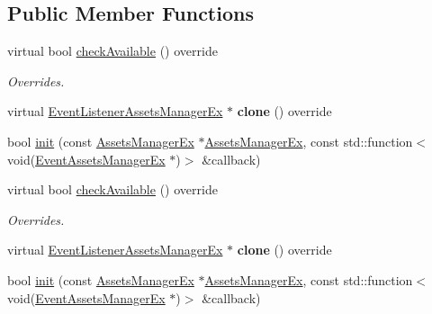 \subsection*{Public Member Functions}
\begin{DoxyCompactItemize}
\item 
\mbox{\label{classEventListenerAssetsManagerEx_aa9c6ee60c7390e0dea4c39a1036a25e4}} 
virtual bool \hyperlink{classEventListenerAssetsManagerEx_aa9c6ee60c7390e0dea4c39a1036a25e4}{check\+Available} () override
\begin{DoxyCompactList}\small\item\em Overrides. \end{DoxyCompactList}\item 
\mbox{\label{classEventListenerAssetsManagerEx_a6981b7ce473804c5f5978c598207ebd3}} 
virtual \hyperlink{classEventListenerAssetsManagerEx}{Event\+Listener\+Assets\+Manager\+Ex} $\ast$ {\bfseries clone} () override
\item 
bool \hyperlink{classEventListenerAssetsManagerEx_a23a2632c5bab9e93ea6f1ef01b22a1c7}{init} (const \hyperlink{classAssetsManagerEx}{Assets\+Manager\+Ex} $\ast$\hyperlink{classAssetsManagerEx}{Assets\+Manager\+Ex}, const std\+::function$<$ void(\hyperlink{classEventAssetsManagerEx}{Event\+Assets\+Manager\+Ex} $\ast$)$>$ \&callback)
\item 
\mbox{\label{classEventListenerAssetsManagerEx_a8c04d1cd20093a2dc88d4b2ab56ec5c8}} 
virtual bool \hyperlink{classEventListenerAssetsManagerEx_a8c04d1cd20093a2dc88d4b2ab56ec5c8}{check\+Available} () override
\begin{DoxyCompactList}\small\item\em Overrides. \end{DoxyCompactList}\item 
\mbox{\label{classEventListenerAssetsManagerEx_a8b80c221e7255460eee92dda6f21cfb0}} 
virtual \hyperlink{classEventListenerAssetsManagerEx}{Event\+Listener\+Assets\+Manager\+Ex} $\ast$ {\bfseries clone} () override
\item 
bool \hyperlink{classEventListenerAssetsManagerEx_a23a2632c5bab9e93ea6f1ef01b22a1c7}{init} (const \hyperlink{classAssetsManagerEx}{Assets\+Manager\+Ex} $\ast$\hyperlink{classAssetsManagerEx}{Assets\+Manager\+Ex}, const std\+::function$<$ void(\hyperlink{classEventAssetsManagerEx}{Event\+Assets\+Manager\+Ex} $\ast$)$>$ \&callback)
\end{DoxyCompactItemize}
